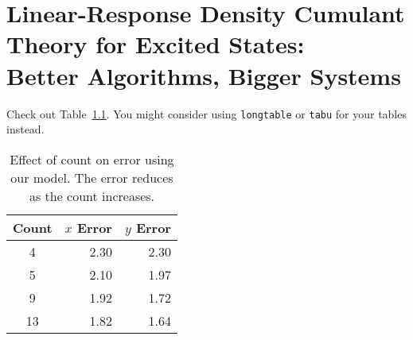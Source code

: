 \chapter[%
    Linear-Response Density Cumulant Theory for Excited States:\\
	Better Algorithms, Bigger Systems
]{%
    Linear-Response Density Cumulant Theory for Excited States:\\
	Better Algorithms, Bigger Systems
}
\label{ch:davidson}

Check out Table~\ref{tbl:calibration}. You might consider using
\texttt{longtable} or \texttt{tabu} for your tables instead.

\begin{table}
  \centering
  \small
  \begin{tabular}{crr}
    \hline
    Count & $x$ Error & $y$ Error\\\hline\hline
    4 & 2.30 & 2.30\\\hline
    5 & 2.10 & 1.97\\\hline
    9 & 1.92 & 1.72\\\hline
    13 & 1.82 & 1.64\\\hline
  \end{tabular}
  \caption[Effect of count on error]
    {Effect of count on error using our model. The error reduces as the count
    increases.}
  \label{tbl:calibration}
\end{table}

\lipsum
